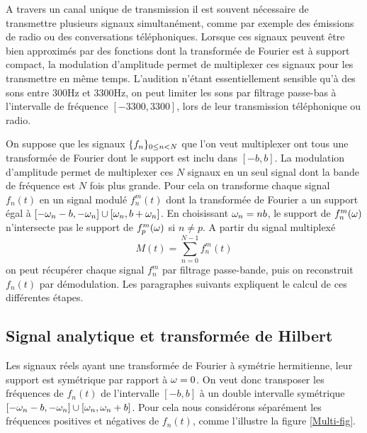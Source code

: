 A travers un canal unique de transmission il est souvent n\'ecessaire
de transmettre plusieurs signaux simultan\'ement, comme par exemple
des \'emissions de radio ou des conversations t\'el\'ephoniques.
Lorsque ces signaux peuvent \^etre bien approxim\'es par des fonctions
dont la transform\'ee de Fourier est \`a support compact, la
modulation d'amplitude permet de multiplexer ces signaux
pour les transmettre en m\^eme temps.
L'audition n'\'etant essentiellement sensible qu'\`a des
sons entre 300Hz et 3300Hz, on peut limiter les sons 
par filtrage passe-bas \`a l'intervalle de fr\'equence 
$[-3300, 3300]$,
lors de leur transmission t\'el\'ephonique ou radio.

On suppose que 
les signaux $\{ f_n \}_{{ 0 \leq n < N}}$ que l'on veut multiplexer ont tous
une transform\'ee de Fourier dont le support est inclu
dans $[-b, b]$. 
La modulation d'amplitude permet de multiplexer ces $N$ signaux
en un seul signal dont la bande de
fr\'equence est $N$ fois plus grande.
Pour cela on 
transforme chaque
signal $f_n(t)$ en un signal modul\'e
$f^m_n (t)$ dont la transform\'ee
de Fourier a un support \'egal \`a 
$[-{\omega}_n-b,-{\omega}_n] \cup [{\omega}_n,b+{\omega}_n]$. 
En choisissant ${\omega}_n = n b$,
le support de $f_n^m ({\omega})$ n'intersecte pas
le support de $f_p^m ({\omega})$ si $n \neq p$. 
A partir du signal multiplex\'e
\begin{equation}
\label{sig-mult}
M(t) = \sum_{n=0}^{N-1}  f^m_n (t) 
\end{equation}
on peut r\'ecup\'erer chaque signal $f^m_n$ par filtrage
passe-bande, puis on reconstruit
$f_n (t)$ par d\'emodulation. 
Les paragraphes suivants expliquent le calcul
de ces diff\'erentes \'etapes.

\subsection{Signal analytique et transform\'ee de Hilbert}

Les signaux r\'eels ayant une transform\'ee de Fourier
\`a sym\'etrie hermitienne, leur
support est sym\'etrique par rapport \`a ${\omega} = 0$.
On veut donc 
transposer les fr\'equences
de $f_n (t)$ de l'intervalle
$[-b,b]$ \`a un double intervalle sym\'etrique
$[-{\omega}_n-b, -{\omega}_n] \cup [{\omega}_n, {\omega}_n+b]$.
Pour cela nous consid\'erons s\'epar\'ement les fr\'equences 
positives et n\'egatives de $f_n(t)$, comme l'illustre la
figure \ref{Multi-fig}.



